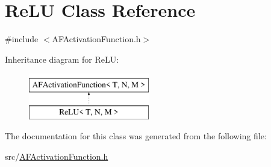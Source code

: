 \hypertarget{class_re_l_u}{}\section{Re\+LU Class Reference}
\label{class_re_l_u}


{\ttfamily \#include $<$A\+F\+Activation\+Function.\+h$>$}

Inheritance diagram for Re\+LU\+:\begin{figure}[H]
\begin{center}
\leavevmode
\includegraphics[height=2.000000cm]{class_re_l_u}
\end{center}
\end{figure}


The documentation for this class was generated from the following file\+:\begin{DoxyCompactItemize}
\item 
src/\hyperlink{_a_f_activation_function_8h}{A\+F\+Activation\+Function.\+h}\end{DoxyCompactItemize}
